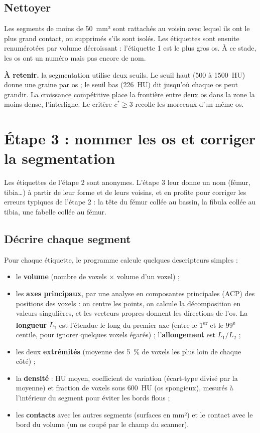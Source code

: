 \documentclass[11pt,a4paper]{article}
\newcommand{\aretenir}[1]{\par\smallskip\noindent\colorbox{fondencadre}{\parbox{\dimexpr\linewidth-2\fboxsep}{%
  \textbf{\color{ecam}À retenir.} #1}}\par\smallskip}
\begin{document}
\subsection{Nettoyer}

Les segments de moins de 50~mm³ sont rattachés au voisin avec lequel ils ont le plus grand contact, ou supprimés
s'ils sont isolés. Les étiquettes sont ensuite renumérotées par volume décroissant : l'étiquette 1 est le plus gros
os. À ce stade, les os ont un numéro mais pas encore de nom.

\aretenir{la segmentation utilise deux seuils. Le seuil haut (500 à 1500~HU) donne une graine par os ; le seuil bas
(226~HU) dit jusqu'où chaque os peut grandir. La croissance compétitive place la frontière entre deux os dans la zone
la moins dense, l'interligne. Le critère $c^* \geq 3$ recolle les morceaux d'un même os.}

\section{Étape 3 : nommer les os et corriger la segmentation}
\label{sec-identification}

Les étiquettes de l'étape 2 sont anonymes. L'étape 3 leur donne un nom (fémur, tibia\ldots) à partir de leur forme et
de leurs voisins, et en profite pour corriger les erreurs typiques de l'étape 2 : la tête du fémur collée au bassin,
la fibula collée au tibia, une fabelle collée au fémur.

\subsection{Décrire chaque segment}

Pour chaque étiquette, le programme calcule quelques descripteurs simples :
\begin{itemize}
  \item le \textbf{volume} (nombre de voxels × volume d'un voxel) ;
  \item les \textbf{axes principaux}, par une analyse en composantes principales (ACP) des positions des voxels : on
  centre les points, on calcule la décomposition en valeurs singulières, et les vecteurs propres donnent les directions
  de l'os. La \textbf{longueur} $L_1$ est l'étendue le long du premier axe (entre le 1\textsuperscript{er} et le
  99\textsuperscript{e} centile, pour ignorer quelques voxels égarés) ; l'\textbf{allongement} est $L_1 / L_2$ ;
  \item les deux \textbf{extrémités} (moyenne des 5~\% de voxels les plus loin de chaque côté) ;
  \item la \textbf{densité} : HU moyen, coefficient de variation (écart-type divisé par la moyenne) et fraction de voxels
  sous 600~HU (os spongieux), mesurés à l'intérieur du segment pour éviter les bords flous ;
  \item les \textbf{contacts} avec les autres segments (surfaces en mm²) et le contact avec le bord du volume (un os
  coupé par le champ du scanner).
\end{itemize}
\end{document}
